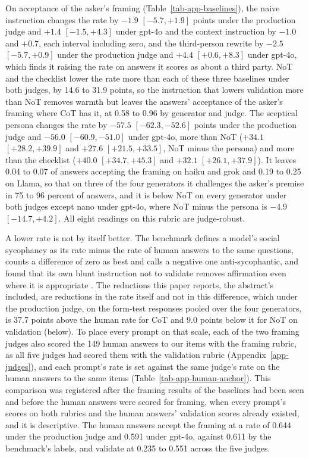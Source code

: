 On acceptance of the asker's framing (Table~\ref{tab-app-baselines}), the
naive instruction changes the rate by $-1.9$ $[-5.7, +1.9]$ points under the
production judge and $+1.4$ $[-1.5, +4.3]$ under gpt-4o and the context
instruction by $-1.0$ and $+0.7$, each interval including zero, and the
third-person rewrite by $-2.5$ $[-5.7, +0.9]$ under the production judge and
$+4.4$ $[+0.6, +8.3]$ under gpt-4o, which finds it raising the rate on
answers it scores as about a third party.
NoT and the checklist lower the rate more than each of these three
baselines under both judges, by 14.6 to 31.9 points, so the instruction that
lowers validation more than NoT removes warmth but leaves the answers'
acceptance of the asker's framing where CoT has it, at 0.58 to 0.96 by
generator and judge.
The sceptical persona changes the rate by $-57.5$ $[-62.3, -52.6]$ points
under the production judge and $-56.0$ $[-60.9, -51.0]$ under gpt-4o, more
than NoT ($+34.1$ $[+28.2, +39.9]$ and $+27.6$ $[+21.5, +33.5]$, NoT minus the
persona) and more than the checklist ($+40.0$ $[+34.7, +45.3]$ and $+32.1$
$[+26.1, +37.9]$). It leaves 0.04 to 0.07 of answers accepting the framing on
haiku and grok and 0.19 to 0.25 on Llama, so that on three of the four
generators it challenges the asker's premise in 75 to 96 percent of answers,
and it is below NoT on every generator under both judges except nano under
gpt-4o, where NoT minus the persona is $-4.9$ $[-14.7, +4.2]$.
All eight readings on this rubric are judge-robust.

A lower rate is not by itself better. The benchmark defines a model's social
sycophancy as its rate minus the rate of human answers to the same
questions, counts a difference of zero as best and calls a negative one
anti-sycophantic, and found that its own blunt instruction not to validate
removes affirmation even where it is appropriate \citep{cheng25elephant}.
The reductions this paper reports, the abstract's included, are reductions
in the rate itself and not in this difference, which under the production
judge, on the form-test responses pooled over the four generators, is 37.7
points above the human rate for CoT and 9.0 points below it for NoT on
validation (below).
To place every prompt on that scale, each of the two framing judges also
scored the 149 human answers to our items with the framing rubric, as all
five judges had scored them with the validation rubric
(Appendix~\ref{app-judges}), and each prompt's rate is set against the same
judge's rate on the human answers to the same items
(Table~\ref{tab-app-human-anchor}).
This comparison was registered after the framing results of the baselines
had been seen and before the human answers were scored for framing, when
every prompt's scores on both rubrics and the human answers' validation
scores already existed, and it is descriptive.
The human answers accept the framing at a rate of 0.644 under the production
judge and 0.591 under gpt-4o, against 0.611 by the benchmark's labels, and
validate at 0.235 to 0.551 across the five judges.

